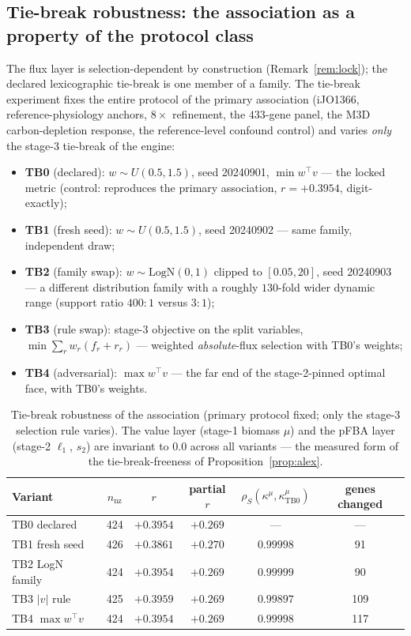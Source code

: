 \documentclass[11pt,a4paper]{article}
\theoremstyle{plain}
\theoremstyle{definition}
\theoremstyle{remark}
\newcommand{\kmu}{\kappa^{\mu}}
\begin{document}
\subsection{Tie-break robustness: the association as a property
of the protocol class}\label{sec:v8}

The flux layer is selection-dependent by construction
(Remark~\ref{rem:lock}); the declared lexicographic tie-break is one
member of a family. The tie-break experiment fixes the entire protocol of the primary association (iJO1366, reference-physiology anchors, $8\times$ refinement, the $433$-gene panel, the M3D carbon-depletion response, the reference-level confound control) and varies \emph{only} the stage-3 tie-break of the
engine:
\begin{itemize}
\item \textbf{TB0} (declared): $w \sim U(0.5, 1.5)$, seed 20240901,
      $\min w^\top v$ --- the locked metric (control: reproduces the
      primary association, $r = +0.3954$, digit-exactly);
\item \textbf{TB1} (fresh seed): $w \sim U(0.5, 1.5)$, seed 20240902
      --- same family, independent draw;
\item \textbf{TB2} (family swap): $w \sim \mathrm{LogN}(0, 1)$ clipped
      to $[0.05, 20]$, seed 20240903 --- a different distribution
      family with a roughly $130$-fold wider dynamic range
      (support ratio $400{:}1$ versus $3{:}1$);
\item \textbf{TB3} (rule swap): stage-3 objective on the split
      variables, $\min \sum_r w_r (f_r + r_r)$ --- weighted
      \emph{absolute}-flux selection with TB0's weights;
\item \textbf{TB4} (adversarial): $\max w^\top v$ --- the far end of
      the stage-2-pinned optimal face, with TB0's weights.
\end{itemize}

\begin{table}[t]
\centering
\caption{Tie-break robustness of the association (primary protocol fixed; only the stage-3 selection rule varies). The value layer
(stage-1 biomass $\mu$) and the pFBA layer (stage-2 $\ell_1$, $s_2$)
are invariant to $0.0$ across all variants --- the measured form of
the tie-break-freeness of Proposition~\ref{prop:alex}.}
\label{tab:v8}
\begin{tabular}{lccccc}
\toprule
Variant & $n_{\mathrm{nz}}$ & $r$ & partial $r$ &
$\rho_S(\kmu, \kmu_{\mathrm{TB0}})$ & genes changed \\
\midrule
TB0 declared       & 424 & $+0.3954$ & $+0.269$ & --- & --- \\
TB1 fresh seed     & 426 & $+0.3861$ & $+0.270$ & $0.99998$ & 91 \\
TB2 LogN family    & 424 & $+0.3954$ & $+0.269$ & $0.99999$ & 90 \\
TB3 $|v|$ rule     & 425 & $+0.3959$ & $+0.269$ & $0.99897$ & 109 \\
TB4 $\max w^\top v$& 424 & $+0.3954$ & $+0.269$ & $0.99998$ & 117 \\
\bottomrule
\end{tabular}
\end{table}
\end{document}
